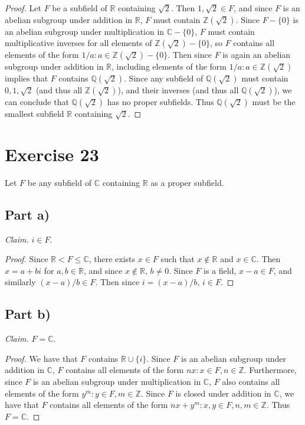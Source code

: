 \documentclass{abrice}
\newcommand{\Z}{\mathbb{Z}}
\newcommand{\R}{\mathbb{R}}
\newcommand{\Q}{\mathbb{Q}}
\renewcommand{\C}{\mathbb{C}}
\begin{document}
\begin{proof}
  Let $F$ be a subfield of $\R$ containing $\sqrt 2$. Then $1, \sqrt 2 \in F$,
  and since $F$ is an abelian subgroup under addition in $\R$, $F$ must contain
  $\Z(\sqrt 2)$. Since $F - \{0\}$ is an abelian subgroup under multiplication
  in $\C - \{0\}$, $F$ must contain multiplicative inverses for all elements of
  $\Z(\sqrt 2) - \{0\}$, so $F$ contains all elements of the form $1/a : a \in \Z(\sqrt
  2) - \{0\}$. Then since $F$ is again an abelian subgroup under addition in
  $\R$, including elements of the form $1/a : a \in \Z(\sqrt 2)$ implies that
  $F$ contains $\Q(\sqrt 2)$. Since any subfield of $\Q(\sqrt 2)$ must contain
  $0, 1, \sqrt 2$ (and thus all $\Z(\sqrt 2)$), and their inverses (and thus all
  $\Q(\sqrt 2)$), we can conclude that $\Q(\sqrt 2)$ has no proper subfields.
  Thus $\Q(\sqrt 2)$ must be the smallest subfield $\R$ containing $\sqrt 2$.
\end{proof}

\section{Exercise 23}

Let $F$ be any subfield of $\C$ containing $\R$ as a proper subfield.

\subsection{Part a)}

\emph{Claim.} $i \in F$.

\begin{proof}
  Since $\R < F \leq \C$, there exists $x \in F$ such that $x \notin \R$ and $x
  \in \C$. Then $x = a + bi$ for $a,b \in \R$, and since $x \notin \R$, $b \neq
  0$. Since $F$ is a field, $x - a \in F$, and similarly $(x - a) / b \in F$.
  Then since $i = (x - a) / b$, $i \in F$.
\end{proof}

\subsection{Part b)}

\emph{Claim.} $F = \C$.

\begin{proof}
  We have that $F$ contains $\R \cup \{i\}$. Since $F$ is an abelian subgroup
  under addition in $\C$, $F$ contains all elements of the form $nx : x \in F, n
  \in \Z$. Furthermore, since $F$ is an abelian subgroup under multiplication in
  $\C$, $F$ also contains all elements of the form $y^m : y \in F, m \in \Z$.
  Since $F$ is closed under addition in $\C$, we have that $F$ contains all
  elements of the form $nx + y^m : x,y \in F, n,m \in \Z$. Thus $F = \C$.
\end{proof}
\end{document}
